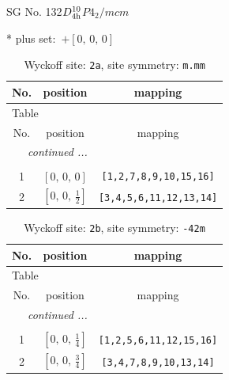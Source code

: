 \documentclass[fleqn,8pt]{jsarticle}
\begin{document}
\setcounter{MaxMatrixCols}{32}

\renewcommand{\tablename}{Table~}
\renewcommand{\figurename}{Figure~}
\begin{center}
\LARGE
SG No. 132\quad$D_{\rm 4h}^{10}$\quad$P4_2/mcm$\quad[ tetragonal ]
\end{center}
* plus set:\,\,\,$+\left[ 0,\, 0,\, 0 \right]$
\renewcommand{\arraystretch}{1.2}
\begin{longtable}{ccc}
\caption{Wyckoff site: {\tt 2a}, site symmetry: {\tt m.mm}}
 \\
 \hline \hline
No. & position & mapping \\ \hline \endfirsthead

\multicolumn{2}{l}{\tablename\ \thetable{}} \\
 \hline \hline
No. & position & mapping \\ \hline \endhead

 \hline \hline
\multicolumn{2}{r}{\footnotesize\it continued ...} \\ \endfoot

 \hline \hline
\multicolumn{2}{r}{} \\ \endlastfoot

1 & $\left[ 0,\, 0,\, 0 \right]$ & {\tt [1,2,7,8,9,10,15,16]} \\ \hline
2 & $\left[ 0,\, 0,\, \frac{1}{2} \right]$ & {\tt [3,4,5,6,11,12,13,14]} \\
\end{longtable}
\renewcommand{\arraystretch}{1.2}
\begin{longtable}{ccc}
\caption{Wyckoff site: {\tt 2b}, site symmetry: {\tt -42m}}
 \\
 \hline \hline
No. & position & mapping \\ \hline \endfirsthead

\multicolumn{2}{l}{\tablename\ \thetable{}} \\
 \hline \hline
No. & position & mapping \\ \hline \endhead

 \hline \hline
\multicolumn{2}{r}{\footnotesize\it continued ...} \\ \endfoot

 \hline \hline
\multicolumn{2}{r}{} \\ \endlastfoot

1 & $\left[ 0,\, 0,\, \frac{1}{4} \right]$ & {\tt [1,2,5,6,11,12,15,16]} \\ \hline
2 & $\left[ 0,\, 0,\, \frac{3}{4} \right]$ & {\tt [3,4,7,8,9,10,13,14]} \\
\end{longtable}
\end{document}
